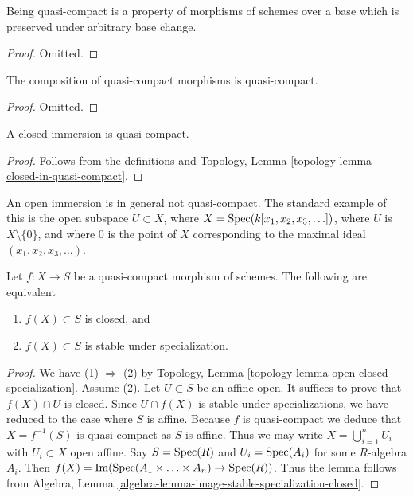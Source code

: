 \begin{lemma}
\label{lemma-quasi-compact-preserved-base-change}
Being quasi-compact is a property of morphisms of schemes
over a base which is preserved under arbitrary base change.
\end{lemma}

\begin{proof}
Omitted.
\end{proof}

\begin{lemma}
\label{lemma-composition-quasi-compact}
The composition of quasi-compact morphisms is quasi-compact.
\end{lemma}

\begin{proof}
Omitted.
\end{proof}

\begin{lemma}
\label{lemma-closed-immersion-quasi-compact}
A closed immersion is quasi-compact.
\end{lemma}

\begin{proof}
Follows from the definitions and
Topology, Lemma \ref{topology-lemma-closed-in-quasi-compact}.
\end{proof}

\begin{example}
\label{example-open-immersion-not-quasi-compact}
An open immersion is in general not quasi-compact.
The standard example of this is the open subspace
$U \subset X$, where $X = \mathop{\rm Spec}(k[x_1, x_2, x_3, \ldots])$,
where $U$ is $X \setminus \{0\}$, and where $0$ is the point
of $X$ corresponding to the maximal ideal
$(x_1, x_2, x_3, \ldots)$.
\end{example}

\begin{lemma}
\label{lemma-image-quasi-compact-closed}
Let $f : X \to S$ be a quasi-compact morphism of schemes.
The following are equivalent
\begin{enumerate}
\item $f(X) \subset S$ is closed, and
\item $f(X) \subset S$ is stable under specialization.
\end{enumerate}
\end{lemma}

\begin{proof}
We have (1) $\Rightarrow$ (2) by
Topology, Lemma \ref{topology-lemma-open-closed-specialization}.
Assume (2). Let $U \subset S$ be an affine open. It suffices to prove
that $f(X) \cap U$ is closed. Since $U \cap f(X)$ is stable under
specializations, we have reduced to the case where $S$ is affine.
Because $f$ is quasi-compact we deduce that $X = f^{-1}(S)$ is
quasi-compact as $S$ is affine. Thus we may write
$X = \bigcup_{i = 1}^n U_i$ with $U_i \subset X$ open affine.
Say $S = \mathop{\rm Spec}(R)$ and
$U_i = \mathop{\rm Spec}(A_i)$ for some $R$-algebra $A_i$.
Then $f(X) = \text{Im}(\mathop{\rm Spec}(A_1 \times \ldots \times A_n)
\to \mathop{\rm Spec}(R))$. Thus the lemma follows from
Algebra, Lemma \ref{algebra-lemma-image-stable-specialization-closed}.
\end{proof}

